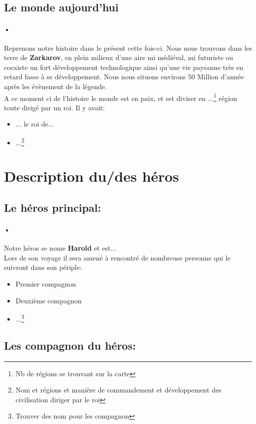 \subsection{Le monde aujourd'hui}
\paragraph{•}Reprenons notre histoire dans le présent cette fois-ci. Nous nous trouvons dans les terre de \textbf{Zarkarov}, en plein milieux d'une aire mi médiéval, mi futuriste ou coexiste un fort développement technologique ainsi qu'une vie paysanne très en retard fasse à se développement. Nous nous situons environs 50 Million d'année après les évènement de la légende.\\
A ce moment ci de l'histoire le monde est en paix, et est diviser en ...\footnote{Nb de régions se trouvant sur la carte} région toute dirigé par un roi.
Il y avait:
\begin{itemize}
	\item ... le roi de...
	\item ...\footnote{Nom et régions et manière de commandement et développement des civilisation diriger par le roi}
\end{itemize}
\newpage


\section{Description du/des héros}
\subsection{Le héros principal:}
\paragraph{•}Notre héros se nome \textbf{Harold} et est...\\
Lors de son voyage il sera amené à rencontré de nombreuse personne qui le suivront dans son périple:
\begin{itemize}
	\item Premier compagnon
	\item Deuxième compagnon
	\item ...\footnote{Trouver des nom pour les compagnon}
\end{itemize}
\subsection{Les compagnon du héros:}
